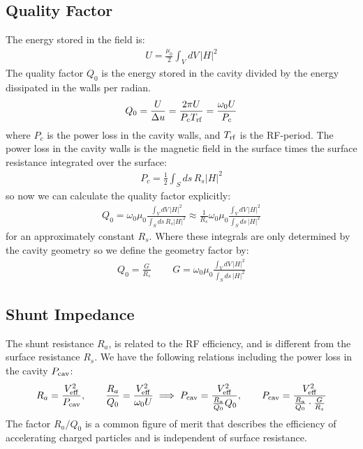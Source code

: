 \documentclass{article}
\numberwithin{equation}{section}
\begin{document}
\subsection{Quality Factor}
The energy stored in the field is:
\begin{align}
U = \frac{\mu_0}{2} \int_V dV \, |H|^2
\end{align}
The quality factor $Q_0$ is the energy stored in the cavity divided by the energy dissipated in the walls per radian. 
\begin{align}
Q_0 = \frac{U}{\Delta u} = \frac{2 \pi U}{P_c T_{\rm rf}} = \frac{\omega_0 U}{P_c}
\end{align}
where $P_c$ is the power loss in the cavity walls, and $T_{\rm rf}$ is the RF-period. The power loss in the cavity walls is the magnetic field in the surface times the surface resistance integrated over the surface:
\begin{align}
P_c = \frac{1}{2} \int_S ds \, R_s |H|^2 
\end{align}
so now we can calculate the quality factor explicitly:
\begin{align}
Q_0 = \omega_0 \mu_0 \frac{ \int_V dV \, |H|^2 }{\int_S ds \, R_s |H|^2 }
\approx \frac{1}{R_s} \omega_0 \mu_0 \frac{ \int_V dV \, |H|^2 }{\int_S ds \, |H|^2 }
\end{align}
for an approximately constant $R_s$. Where these integrals are only determined by the cavity geometry so we define the geometry factor by:
\begin{align}
Q_0 = \frac{G}{R_s} \, \qquad G =  \omega_0 \mu_0 \frac{ \int_V dV \, |H|^2 }{\int_S ds \, |H|^2 }
\end{align}

\subsection{Shunt Impedance}
The shunt resistance $R_a$, is related to the RF efficiency, and is different from the surface resistance $R_s$. We have the following relations including the power loss in the cavity $P_{\rm cav}$:
\begin{align}
R_a = \frac{V_{\rm eff}^2}{P_{\rm cav}} ,\qquad
\frac{R_a}{Q_0} = \frac{V_{\rm eff}^2}{\omega_0 U} \implies
P_{\rm cav} = \frac{V_{\rm eff}^2 }{\frac{R_a}{Q_0} Q_0} ,\qquad
P_{\rm cav} = \frac{V_{\rm eff}^2 }{\frac{R_a}{Q_0} \cdot \frac{G}{R_s} } 
\end{align}
The factor $R_a / Q_0$ is a common figure of merit that describes the efficiency of accelerating charged particles and is independent of surface resistance.
\end{document}
